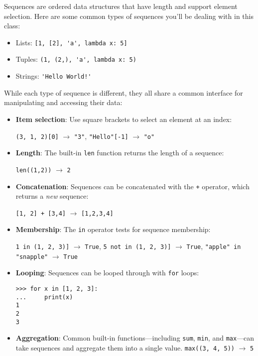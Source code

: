 Sequences are ordered data structures that have length and support element selection. Here are some common types of sequences you'll be dealing with in this class: 
\begin{itemize}
	\item Lists: \lstinline{[1, [2], 'a', lambda x: 5]}
	\item Tuples: \lstinline{(1, (2,), 'a', lambda x: 5)}
	\item Strings: \lstinline{'Hello World!'}
\end{itemize}

While each type of sequence is different, they all share a common interface for manipulating and accessing their data: 
\begin{itemize}
\item \textbf{Item selection}: Use square brackets to select an element at an index: 
	
\lstinline{(3, 1, 2)[0]} $\rightarrow$ \lstinline{"3"}, \quad \lstinline{"Hello"[-1]} $\rightarrow$ \lstinline{"o"}

\item\textbf{Length}: The built-in \lstinline{len} function returns the length of a sequence: 
	
\lstinline{len((1,2))} $\rightarrow$ \lstinline{2}

\item \textbf{Concatenation}: Sequences can be concatenated with the \lstinline{+} operator, which returns a \textit{new} sequence:

\lstinline{[1, 2] + [3,4]} $\rightarrow$ \lstinline{[1,2,3,4]}

\item \textbf{Membership}: The \lstinline{in} operator tests for sequence membership: 

\lstinline{1 in (1, 2, 3)]} $\rightarrow$ \lstinline{True}, \quad \lstinline{5 not in (1, 2, 3)]} $\rightarrow$ \lstinline{True}, \quad \lstinline{"apple" in "snapple"} $\rightarrow$ \lstinline{True}

\item \textbf{Looping}: Sequences can be looped through with \lstinline{for} loops: 
\begin{lstlisting}
>>> for x in [1, 2, 3]:
...     print(x)
1
2
3
\end{lstlisting}


\item \textbf{Aggregation}: Common built-in functions---including \lstinline{sum}, \lstinline{min}, and \lstinline{max}---can take sequences and aggregate them into a single value.
\lstinline{max((3, 4, 5))} $\rightarrow$ \lstinline{5}


\end{itemize}
